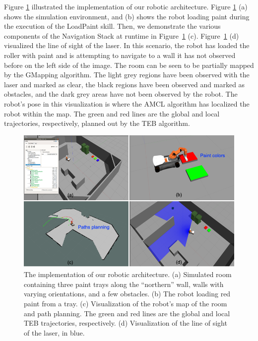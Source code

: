 Figure \ref{fig:implement} illustrated the implementation of our robotic architecture. %
Figure \ref{fig:implement} (a) shows the simulation environment, and (b) shows the robot loading paint during the execution of the LoadPaint skill. Then, we demonstrate the various components of the Navigation Stack at runtime in Figure~\ref{fig:implement} (c). Figure~\ref{fig:implement} (d) visualized the  line of sight of the laser. In this scenario, the robot has loaded the roller with paint and is attempting to navigate to a wall it has not observed before on the left side of the image. The room can be seen to be partially mapped by the GMapping algorithm. The light grey regions have been observed with the laser and marked as clear, the black regions have been observed and marked as obstacles, and the dark grey areas have not been observed by the robot. The robot's pose in this visualization is where the AMCL algorithm has localized the robot within the map. The green and red lines are the global and local trajectories, respectively, planned out by the TEB algorithm.


\begin{figure}
    \centering
    \includegraphics[width=1.0 \linewidth]{images/implement.png}
    \caption{The implementation of our robotic architecture. (a) Simulated room containing three paint trays along the ``northern'' wall, walls with varying orientations, and a few obstacles. (b) The robot loading red paint from a tray. (c) Visualization of the robot's map of the room and path planning. The green and red lines are the global and local TEB trajectories, respectively. (d) Visualization of the line of sight of the laser, in blue.}
    \label{fig:implement}
\end{figure}
